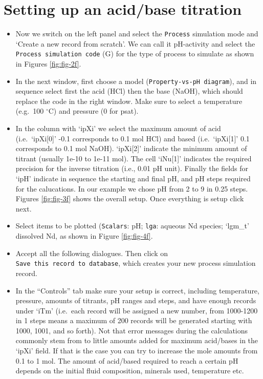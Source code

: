 \documentclass[
]{book}
\begin{document}
\hypertarget{setting-up-an-acidbase-titration}{%
\section{Setting up an acid/base titration}\label{setting-up-an-acidbase-titration}}

\begin{itemize}
\item
  Now we switch on the left panel and select the \texttt{Process} simulation mode and `Create a new record from scratch'. We can call it pH-activity and select the \texttt{Process\ simulation\ code} (G) for the type of process to simulate as shown in Figures \ref{fig:fig-2f}.
\item
  In the next window, first choose a model (\texttt{Property-vs-pH\ diagram}), and in sequence select first the acid (HCl) then the base (NaOH), which should replace the code in the right window. Make sure to select a temperature (e.g.~100 \(^\circ\)C) and pressure (0 for psat).
\item
  In the column with `ipXi' we select the maximum amount of acid (i.e.~`ipXi{[}0{]}' -0.1 corresponds to 0.1 mol HCl) and based (i.e.~`ipXi{[}1{]}' 0.1 corresponds to 0.1 mol NaOH). `ipXi{[}2{]}' indicate the minimum amount of titrant (usually 1e-10 to 1e-11 mol). The cell `iNu{[}1{]}' indicates the required precision for the inverse titration (i.e., 0.01 pH unit). Finally the fields for `ipH' indicate in sequence the starting and final pH, and pH steps required for the calucations. In our example we chose pH from 2 to 9 in 0.25 steps. Figures \ref{fig:fig-3f} shows the overall setup. Once everything is setup click next.
\item
  Select items to be plotted (\texttt{Scalars}: pH; \texttt{lga}: aqueous Nd species; `lgm\_t' dissolved Nd, as shown in Figure \ref{fig:fig-4f}.
\item
  Accept all the following dialogues. Then click on \texttt{Save\ this\ record\ to\ database}, which creates your new process simulation record.
\item
  In the ``Controls'' tab make sure your setup is correct, including temperature, pressure, amounts of titrants, pH ranges and steps, and have enough records under `iTm' (i.e.~each record will be assigned a new number, from 1000-1200 in 1 steps means a maximum of 200 records will be generated starting with 1000, 1001, and so forth). Not that error messages during the calculations commonly stem from to little amounts added for maximum acid/bases in the `ipXi' field. If that is the case you can try to increase the mole amounts from 0.1 to 1 mol. The amount of acid/based required to reach a certain pH depends on the initial fluid composition, minerals used, temperature etc.
\end{itemize}
\end{document}
